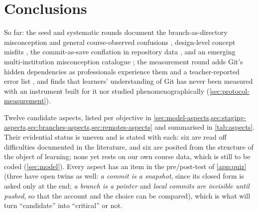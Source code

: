 \mode*
\section{Conclusions}

\rqmisconceptions*
So far: the seed and systematic rounds document the branch-as-directory
misconception and general course-observed confusions
\autocite{IsomottonenCochez2014}, design-level concept misfits
\autocite{DeRossoJackson2016Gitless}, the commit-as-save conflation in
repository data \autocite{Cochez2013DVCSUsage}, and an emerging
multi-institution misconception catalogue
\autocite{Postner2026GitMisconceptions}; the measurement round adds Git's
hidden dependencies as professionals experience them
\autocite{Church2014HiddenDependencies} and a teacher-reported error list
\autocite{Eraslan2020GitErrors}, and finds that learners' understanding
of Git has never been measured with an instrument built for it nor
studied phenomenographically (\cref{sec:protocol-measurement}).

\rqaspects*
Twelve candidate aspects, listed per objective in
\cref{sec:model-aspects,sec:staging-aspects,sec:branches-aspects,sec:remotes-aspects}
and summarised in \cref{tab:aspects}.
Their evidential status is uneven and is stated with each: six are read
off difficulties documented in the literature, and six are posited from
the structure of the object of learning; none yet rests on our own
course data, which is still to be coded (\cref{sec:model}).
Every aspect has an item in the pre/post-test of \cref{app:quiz} (three
have open twins as well: \emph{a commit is a snapshot}, since its closed
form is asked only at the end; \emph{a branch is a pointer} and
\emph{local commits are invisible until pushed}, so that the account and
the choice can be compared), which is what will turn \enquote{candidate}
into \enquote{critical} or not.

